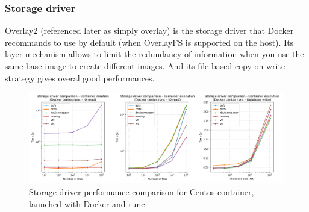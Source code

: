 \subsubsection{Storage driver}
Overlay2 (referenced later as simply overlay) is the storage driver that Docker recommands to use by default (when OverlayFS is supported on the host).  Its layer mechanism allows to limit the redundancy of information when you use the same base image to create different images.  And its file-based copy-on-write strategy gives overal good performances.

\begin{figure}[h!]
  \begin{center}
    \includegraphics[width=\linewidth]{images/question-1-storage-driver-Docker-centos-runc---Database-write.png}
    \caption{Storage driver performance comparison for Centos container, launched with Docker and runc}
    \label{fig:q1:storage-driver}
  \end{center}
\end{figure}

